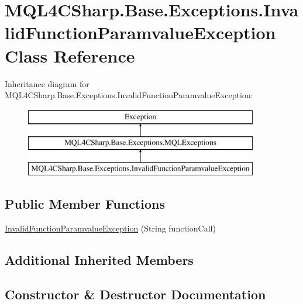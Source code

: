 \hypertarget{class_m_q_l4_c_sharp_1_1_base_1_1_exceptions_1_1_invalid_function_paramvalue_exception}{}\section{M\+Q\+L4\+C\+Sharp.\+Base.\+Exceptions.\+Invalid\+Function\+Paramvalue\+Exception Class Reference}
\label{class_m_q_l4_c_sharp_1_1_base_1_1_exceptions_1_1_invalid_function_paramvalue_exception}
Inheritance diagram for M\+Q\+L4\+C\+Sharp.\+Base.\+Exceptions.\+Invalid\+Function\+Paramvalue\+Exception\+:\begin{figure}[H]
\begin{center}
\leavevmode
\includegraphics[height=3.000000cm]{class_m_q_l4_c_sharp_1_1_base_1_1_exceptions_1_1_invalid_function_paramvalue_exception}
\end{center}
\end{figure}
\subsection*{Public Member Functions}
\begin{DoxyCompactItemize}
\item 
\hyperlink{class_m_q_l4_c_sharp_1_1_base_1_1_exceptions_1_1_invalid_function_paramvalue_exception_a124972c3dd3624c6450d6c07b846dd13}{Invalid\+Function\+Paramvalue\+Exception} (String function\+Call)
\end{DoxyCompactItemize}
\subsection*{Additional Inherited Members}


\subsection{Constructor \& Destructor Documentation}
